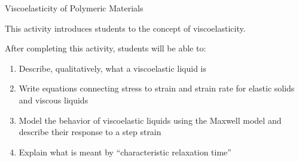 %
%
%
%

\renewcommand{\figpath}{content/polymphys/mechanical-properties/viscoelasticity/figs}
\renewcommand{\labelbase}{viscoelasticity}

\begin{activity}{Viscoelasticity of Polymeric Materials}

\begin{instructornotes}

	This activity introduces students to the concept of viscoelasticity.
	
	After completing this activity, students will be able to:
			\begin{enumerate}
				\item Describe, qualitatively, what a viscoelastic liquid is
				\item Write equations connecting stress to strain and strain rate for elastic solids and viscous liquids
				\item Model the behavior of viscoelastic liquids using the Maxwell model and describe their response to a step strain
				\item Explain what is meant by ``characteristic relaxation time''
			\end{enumerate}
	
			

\end{instructornotes}
\end{activity}
